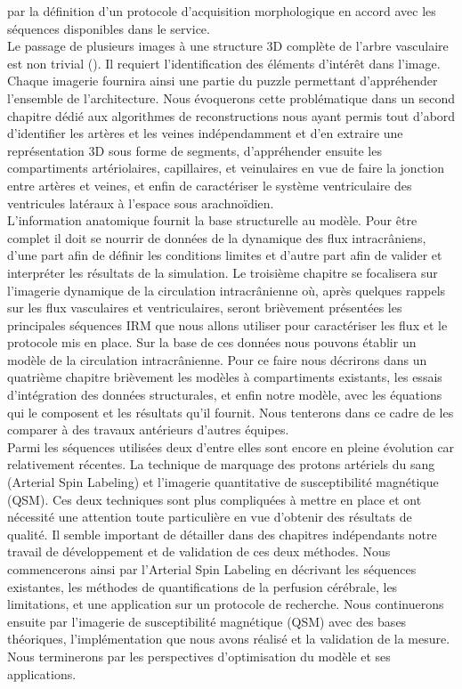 par la définition d’un protocole d’acquisition morphologique en accord avec les séquences disponibles dans le service.\\
Le passage de plusieurs images à une structure 3D complète de l’arbre vasculaire est non trivial (\cite{Luboz2005}). Il requiert l’identification des éléments d’intérêt dans l’image. Chaque imagerie fournira ainsi 
une partie du puzzle permettant d’appréhender l’ensemble de l’architecture. Nous évoquerons cette problématique dans un second chapitre dédié aux algorithmes de reconstructions nous ayant permis tout 
d’abord d’identifier les artères et les veines indépendamment et d’en extraire une représentation 3D sous forme de segments, d’appréhender ensuite les compartiments artériolaires, capillaires, et
veinulaires en vue de faire la jonction entre artères et veines, et enfin de caractériser le système ventriculaire des ventricules latéraux à l’espace sous arachnoïdien.\\
L’information anatomique fournit la base structurelle au modèle. Pour être complet il doit se nourrir de données de la dynamique des flux intracrâniens, d’une part afin de définir les conditions 
limites et d’autre part afin de valider et interpréter les résultats de la simulation. Le troisième chapitre se focalisera sur l’imagerie dynamique de la circulation intracrânienne où, après quelques 
rappels sur les flux vasculaires et ventriculaires, seront brièvement présentées les principales séquences IRM que nous allons utiliser pour caractériser les flux et le protocole mis en place.
Sur la base de ces données nous pouvons établir un modèle de la circulation intracrânienne. Pour ce faire nous décrirons dans un quatrième chapitre brièvement les modèles à compartiments existants, 
les essais d’intégration des données structurales, et enfin notre modèle, avec les équations qui le composent et les résultats qu’il fournit. Nous tenterons dans ce cadre de les comparer à des travaux 
antérieurs d’autres équipes.\\
Parmi les séquences utilisées deux d’entre elles sont encore en pleine évolution car relativement récentes. La technique de marquage des protons artériels du sang (Arterial Spin Labeling) et l’imagerie 
quantitative de susceptibilité magnétique (QSM). Ces deux techniques sont plus compliquées à mettre en place et ont nécessité une attention toute particulière en vue d’obtenir des résultats de qualité. 
Il semble important de détailler dans des chapitres indépendants notre travail de développement et de validation de ces deux méthodes. Nous commencerons ainsi par l’Arterial Spin Labeling en décrivant 
les séquences existantes, les méthodes de quantifications de la perfusion cérébrale, les limitations, et une application sur un protocole de recherche. Nous continuerons ensuite par l’imagerie de 
susceptibilité magnétique (QSM) avec des bases théoriques, l’implémentation que nous avons réalisé et la validation de la mesure.
Nous terminerons par les perspectives d’optimisation du modèle et ses applications.\\

		
{}

